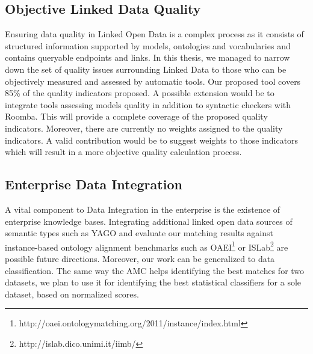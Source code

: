 \documentclass[a4paper,11pt,twoside]{ThesisStyle}
\begin{document}
\subsection{Objective Linked Data Quality}
Ensuring data quality in Linked Open Data is a complex process as it consists of structured information supported by models, ontologies and vocabularies and contains queryable endpoints and links. In this thesis, we managed to narrow down the set of quality issues surrounding Linked Data to those who can be objectively measured and assessed by automatic tools. Our proposed tool covers 85\% of the quality indicators proposed. A possible extension would be to integrate tools assessing models quality in addition to syntactic checkers with Roomba. This will provide a complete coverage of the proposed quality indicators. Moreover, there are currently no weights assigned to the quality indicators. A valid contribution would be to suggest weights to those indicators which will result in a more objective quality calculation process.

\subsection{Enterprise Data Integration}
A vital component to Data Integration in the enterprise is the existence of enterprise knowledge bases. Integrating additional linked open data sources of semantic types such as YAGO and evaluate our matching results against instance-based ontology alignment benchmarks such as OAEI\footnote{http://oaei.ontologymatching.org/2011/instance/index.html} or ISLab\footnote{http://islab.dico.unimi.it/iimb/} are possible future directions. Moreover, our work can be generalized to data classification. The same way the AMC helps identifying the best matches for two datasets, we plan to use it for identifying the best statistical classifiers for a sole dataset, based on normalized scores.




\vspace{-15ex}
\end{document}
